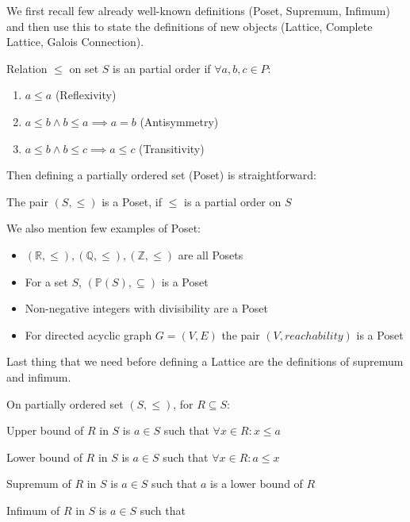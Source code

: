 We first recall few already well-known definitions (Poset, Supremum, Infimum) and then use this
to state the definitions of new objects (Lattice, Complete Lattice, Galois Connection).

\begin{defn}
    Relation $\leq$ on set $S$ is an partial order if $\forall a, b, c \in P$:
    \begin{enumerate}
        \item $a \leq a$ (Reflexivity)
        \item $a \leq b \land b \leq a \implies a = b$ (Antisymmetry)
        \item $a \leq b \land b \leq c \implies a \leq c$ (Transitivity)
    \end{enumerate}
\end{defn}

Then defining a partially ordered set (Poset) is straightforward:

\begin{defn}[Poset]
    The pair $(S, \leq)$ is a Poset, if $\leq$ is a partial order on $S$
\end{defn}

We also mention few examples of Poset:

\begin{itemize}
    \item $(\mathbb{R}, \leq), (\mathbb{Q}, \leq), (\mathbb{Z}, \leq)$ are all Posets
    \item For a set $S$, $(\mathbb{P}(S), \subseteq)$ is a Poset
    \item Non-negative integers with divisibility are a Poset
    \item For directed acyclic graph $G=(V,E)$ the pair $(V, reachability)$ is a Poset
\end{itemize}

Last thing that we need before defining a Lattice are the definitions of supremum and infimum.

\begin{defn}
    On partially ordered set $(S, \leq)$, for $R \subseteq S$:

    Upper bound of $R$ in $S$ is $a \in S$ such that $\forall x \in R: x \leq a$

    Lower bound of $R$ in $S$ is $a \in S$ such that $\forall x \in R: a \leq x$

    Supremum of $R$ in $S$ is $a \in S$ such that $a$ is a lower bound of $R$ %

    Infimum of $R$ in $S$ is $a \in S$ such that
\end{defn}


